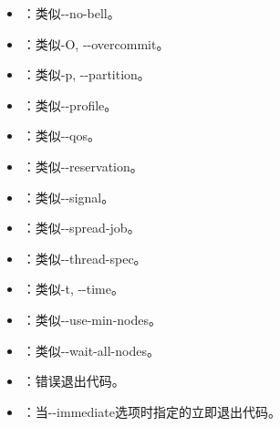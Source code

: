 \begin{itemize}
	\item {}：类似-{}-no-bell。
	\item {}：类似-O, -{}-overcommit。
	\item {}：类似-p, -{}-partition。
	\item {}：类似-{}-profile。
	\item {}：类似-{}-qos。
	\item {}：类似-{}-reservation。
	\item {}：类似-{}-signal。
	\item {}：类似-{}-spread-job。
	\item {}：类似-{}-thread-spec。
	\item {}：类似-t, -{}-time。
	\item {}：类似-{}-use-min-nodes。
	\item {}：类似-{}-wait-all-nodes。
	\item {}：错误退出代码。
	\item {}：当-{}-immediate选项时指定的立即退出代码。
\end{itemize}

